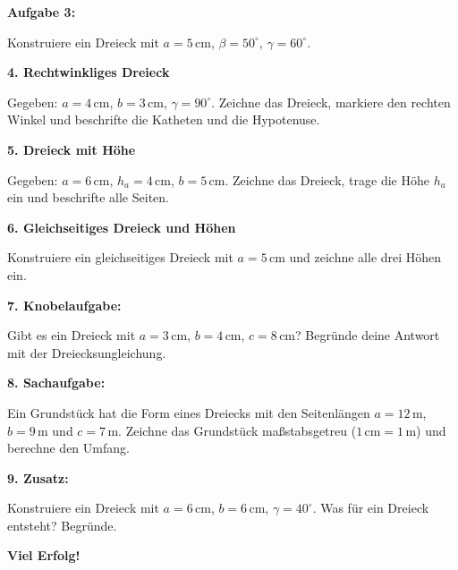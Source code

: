 \vspace{0.5em}

\textbf{Aufgabe 3:}

Konstruiere ein Dreieck mit $a=5\,\mathrm{cm}$, $\beta=50^\circ$, $\gamma=60^\circ$.

\vspace{0.5em}

\textbf{4. Rechtwinkliges Dreieck}

Gegeben: $a=4\,\mathrm{cm}$, $b=3\,\mathrm{cm}$, $\gamma=90^\circ$. Zeichne das Dreieck, markiere den rechten Winkel und beschrifte die Katheten und die Hypotenuse.

\vspace{0.5em}

\textbf{5. Dreieck mit Höhe}

Gegeben: $a=6\,\mathrm{cm}$, $h_a=4\,\mathrm{cm}$, $b=5\,\mathrm{cm}$. Zeichne das Dreieck, trage die Höhe $h_a$ ein und beschrifte alle Seiten.

\vspace{0.5em}

\textbf{6. Gleichseitiges Dreieck und Höhen}

Konstruiere ein gleichseitiges Dreieck mit $a=5\,\mathrm{cm}$ und zeichne alle drei Höhen ein.

\begin{center}
\end{center}

\vspace{0.5em}

\textbf{7. Knobelaufgabe:}

Gibt es ein Dreieck mit $a=3\,\mathrm{cm}$, $b=4\,\mathrm{cm}$, $c=8\,\mathrm{cm}$? Begründe deine Antwort mit der Dreiecksungleichung.

\vspace{0.5em}

\textbf{8. Sachaufgabe:}

Ein Grundstück hat die Form eines Dreiecks mit den Seitenlängen $a=12\,\mathrm{m}$, $b=9\,\mathrm{m}$ und $c=7\,\mathrm{m}$. Zeichne das Grundstück maßstabsgetreu ($1\,\mathrm{cm} = 1\,\mathrm{m}$) und berechne den Umfang.

\vspace{0.5em}

\textbf{9. Zusatz:}

Konstruiere ein Dreieck mit $a=6\,\mathrm{cm}$, $b=6\,\mathrm{cm}$, $\gamma=40^\circ$. Was für ein Dreieck entsteht? Begründe.

\textbf{Viel Erfolg!}